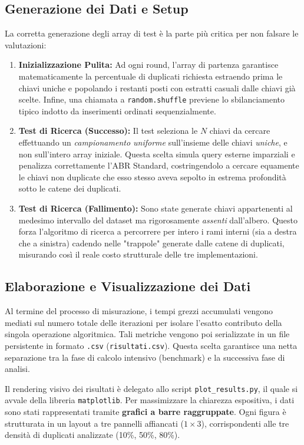 \documentclass[11pt,a4paper]{article}
\begin{document}
\subsection{Generazione dei Dati e Setup}

La corretta generazione degli array di test è la parte più critica per non falsare le valutazioni:
\begin{enumerate}
    \item \textbf{Inizializzazione Pulita:} Ad ogni round, l'array di partenza garantisce matematicamente la percentuale di duplicati richiesta estraendo prima le chiavi uniche e popolando i restanti posti con estratti casuali dalle chiavi già scelte. Infine, una chiamata a \texttt{random.shuffle} previene lo sbilanciamento tipico indotto da inserimenti ordinati sequenzialmente.
    \item \textbf{Test di Ricerca (Successo):} Il test seleziona le $N$ chiavi da cercare effettuando un \textit{campionamento uniforme} sull'insieme delle chiavi \textit{uniche}, e non sull'intero array iniziale. Questa scelta simula query esterne imparziali e penalizza correttamente l'ABR Standard, costringendolo a cercare equamente le chiavi non duplicate che esso stesso aveva sepolto in estrema profondità sotto le catene dei duplicati.
    \item \textbf{Test di Ricerca (Fallimento):} Sono state generate chiavi appartenenti al medesimo intervallo del dataset ma rigorosamente \textit{assenti} dall'albero. Questo forza l'algoritmo di ricerca a percorrere per intero i rami interni (sia a destra che a sinistra) cadendo nelle "trappole" generate dalle catene di duplicati, misurando così il reale costo strutturale delle tre implementazioni.
\end{enumerate}

\subsection{Elaborazione e Visualizzazione dei Dati}

Al termine del processo di misurazione, i tempi grezzi accumulati vengono mediati sul numero totale delle iterazioni per isolare l'esatto contributo della singola operazione algoritmica. Tali metriche vengono poi serializzate in un file persistente in formato \texttt{.csv} (\texttt{risultati.csv}). Questa scelta garantisce una netta separazione tra la fase di calcolo intensivo (benchmark) e la successiva fase di analisi.

Il rendering visivo dei risultati è delegato allo script \texttt{plot\_results.py}, il quale si avvale della libreria \texttt{matplotlib}. Per massimizzare la chiarezza espositiva, i dati sono stati rappresentati tramite \textbf{grafici a barre raggruppate}. Ogni figura è strutturata in un layout a tre pannelli affiancati ($1 \times 3$), corrispondenti alle tre densità di duplicati analizzate (10\%, 50\%, 80\%). 
\end{document}

